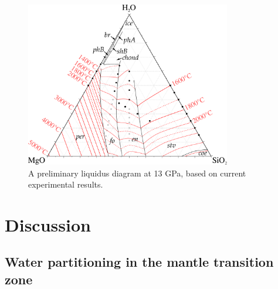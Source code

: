 \documentclass[review]{elsarticle}
\begin{document}
\begin{figure}[ht!]
  \centering
      \includegraphics[width=0.8\textwidth]{figures/experimental-ternary}
  \caption{A preliminary liquidus diagram at 13 GPa, based on current experimental results.}
  \label{fig:liquidus}
\end{figure}


\section{Discussion}
\subsection{Water partitioning in the mantle transition zone}
\end{document}
